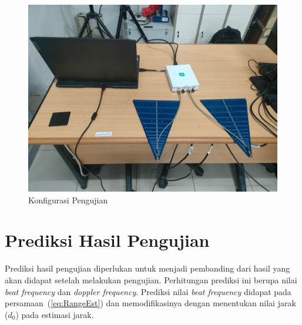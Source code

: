 \begin{figure}
	\begin{center}
		\includegraphics[scale=0.07]{pics/bab3/konfigurasiPengujian.jpg}
		\caption{Konfigurasi Pengujian}
		\label{img:konfigurasi}
	\end{center}
\end{figure}


\section{Prediksi Hasil Pengujian}

Prediksi hasil pengujian diperlukan untuk menjadi pembanding dari hasil yang akan didapat setelah melakukan pengujian. Perhitungan prediksi ini berupa nilai \textit{beat frequency} dan \textit{doppler frequency}. Prediksi nilai \textit{beat frequency} didapat pada persamaan~(\ref{eq:RangeEst}) dan memodifikasinya dengan menentukan nilai jarak ($d_{0}$) pada estimasi jarak. 





